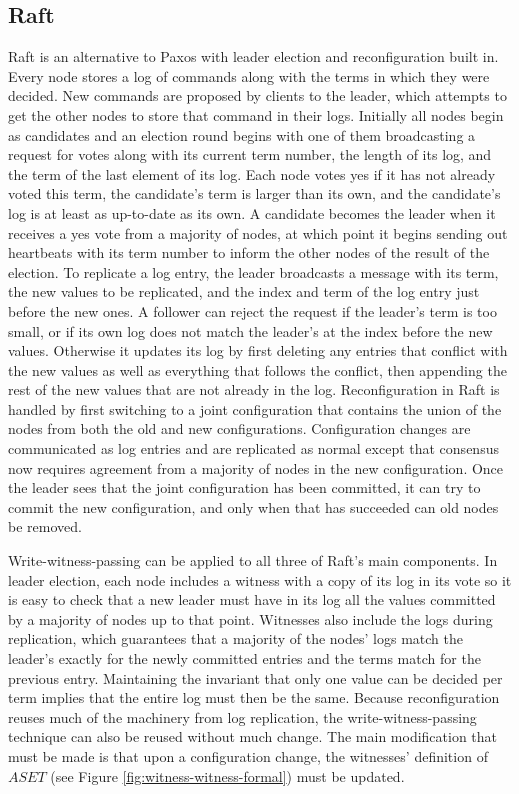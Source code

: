 \subsection{Raft}
\label{subsec:raft}
Raft \cite{raft} is an alternative to Paxos with leader election and reconfiguration built in.
Every node stores a log of commands along with the terms in which they were decided.
New commands are proposed by clients to the leader, which attempts to get the other nodes to store
that command in their logs.
Initially all nodes begin as candidates and an election round begins with one of them broadcasting a
request for votes along with its current term number, the length of its log, and the term of the last
element of its log.
Each node votes yes if it has not already voted this term, the candidate's term is larger than its
own, and the candidate's log is at least as up-to-date as its own.
A candidate becomes the leader when it receives a yes vote from a majority of nodes, at which point
it begins sending out heartbeats with its term number to inform the other nodes of the result of the
election.
To replicate a log entry, the leader broadcasts a message with its term, the new values to be
replicated, and the index and term of the log entry just before the new ones.
A follower can reject the request if the leader's term is too small, or if its own log does not match
the leader's at the index before the new values.
Otherwise it updates its log by first deleting any entries that conflict with the new values as
well as everything that follows the conflict, then appending the rest of the new values that are not already in the
log.
Reconfiguration in Raft is handled by first switching to a joint configuration that contains the union of the nodes
from both the old and new configurations.
Configuration changes are communicated as log entries and are replicated as normal except that consensus now requires
agreement from a majority of nodes in the new configuration.
Once the leader sees that the joint configuration has been committed, it can try to commit the new configuration,
and only when that has succeeded can old nodes be removed.

Write-witness-passing can be applied to all three of Raft's main components.
In leader election, each node includes a witness with a copy of its log in its vote so it is easy to check that a
new leader must have in its log all the values committed by a majority of nodes up to that point.
Witnesses also include the logs during replication, which guarantees that a majority of the nodes' logs match the leader's exactly for
the newly committed entries and the terms match for the previous entry.
Maintaining the invariant that only one value can be decided per term implies that the entire
log must then be the same.
Because reconfiguration reuses much of the machinery from log replication,
the write-witness-passing technique can also be reused without much change.
The main modification that must be made is that upon a configuration change,
the witnesses' definition of $ASET$ (see Figure \ref{fig:witness-witness-formal}) must be updated.

